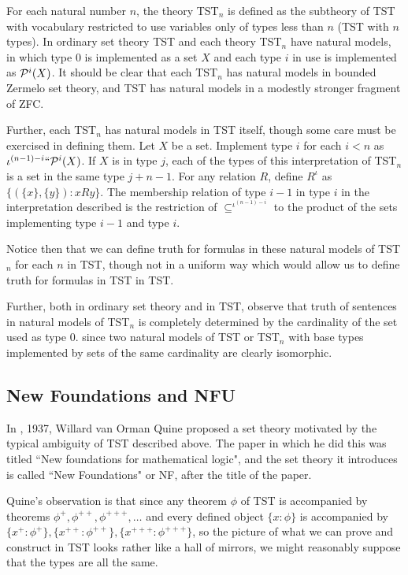 \documentclass[112pt]{article}
\begin{document}
For each natural number $n$, the theory TST$_n$ is defined as the subtheory of TST with vocabulary restricted to use variables only of types less than $n$ (TST with $n$ types).
In ordinary set theory TST and each theory TST$_n$ have natural models, in which type 0 is implemented as a set $X$ and each type $i$ in use is implemented as ${\cal P}^i(X)$.  It should be clear that each TST$_n$ has natural models in bounded Zermelo set theory, and TST has natural models in a modestly stronger fragment of ZFC.

Further, each TST$_n$ has natural models in TST itself, though some care must be exercised in defining them.  Let $X$ be a set.  Implement type $i$ for each $i<n$ as
$\iota^{(n-1)-i}``{\cal P}^i(X)$.  If $X$ is in type $j$, each of the types of this interpretation of TST$_n$ is a set in the same type $j+n-1$.  For any relation $R$, define
$R^{\iota}$ as $\{(\{x\},\{y\}):x R y\}$.  The membership relation of type $i-1$ in type $i$ in the interpretation described is the restriction of $\subseteq^{\iota^{(n-1)-i}}$ to
the product of the sets implementing type $i-1$ and type $i$.

Notice then that we can define truth for formulas in these natural models of TST$_n$ for each $n$ in TST, though not in a uniform way which would allow us to define truth for formulas
in TST in TST.

Further, both in ordinary set theory and in TST, observe that truth of sentences in natural models of TST$_n$ is completely determined by the cardinality of the set used as type 0.
since two natural models of TST or TST$_n$ with base types implemented by sets of the same cardinality are clearly isomorphic. 

\newpage

\subsection{New Foundations and NFU}

In \cite{nf}, 1937, Willard van Orman Quine proposed a set theory motivated by the typical ambiguity of TST described above.  The paper in which he did this was titled ``New foundations for mathematical logic", and the set theory it introduces is called ``New Foundations" or NF, after the title of the paper.

Quine's observation is that since any theorem $\phi$ of TST is accompanied by theorems $\phi^+, \phi^{++}, \phi^{+++}, \ldots$ and every defined object $\{x:\phi\}$ is accompanied by
$\{x^+:\phi^+\},\{x^{++}:\phi^{++}\},\{x^{+++}:\phi^{+++}\}$, so the picture of what we can prove and construct in TST looks rather like a hall of mirrors, we might reasonably suppose that the types are all the same.
\end{document}
